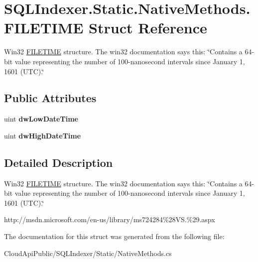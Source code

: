 \hypertarget{struct_s_q_l_indexer_1_1_static_1_1_native_methods_1_1_f_i_l_e_t_i_m_e}{\section{S\-Q\-L\-Indexer.\-Static.\-Native\-Methods.\-F\-I\-L\-E\-T\-I\-M\-E Struct Reference}
\label{struct_s_q_l_indexer_1_1_static_1_1_native_methods_1_1_f_i_l_e_t_i_m_e}
}


Win32 \hyperlink{struct_s_q_l_indexer_1_1_static_1_1_native_methods_1_1_f_i_l_e_t_i_m_e}{F\-I\-L\-E\-T\-I\-M\-E} structure. The win32 documentation says this\-: \char`\"{}\-Contains a 64-\/bit value representing the number of 100-\/nanosecond intervals since January 1, 1601 (\-U\-T\-C).\char`\"{}  


\subsection*{Public Attributes}
\begin{DoxyCompactItemize}
\item 
\hypertarget{struct_s_q_l_indexer_1_1_static_1_1_native_methods_1_1_f_i_l_e_t_i_m_e_a2d953cdb872615ba14bedc9e8d54c4cd}{uint {\bfseries dw\-Low\-Date\-Time}}\label{struct_s_q_l_indexer_1_1_static_1_1_native_methods_1_1_f_i_l_e_t_i_m_e_a2d953cdb872615ba14bedc9e8d54c4cd}

\item 
\hypertarget{struct_s_q_l_indexer_1_1_static_1_1_native_methods_1_1_f_i_l_e_t_i_m_e_a946ae9df944e7d3e7a5fc0d9b99ce291}{uint {\bfseries dw\-High\-Date\-Time}}\label{struct_s_q_l_indexer_1_1_static_1_1_native_methods_1_1_f_i_l_e_t_i_m_e_a946ae9df944e7d3e7a5fc0d9b99ce291}

\end{DoxyCompactItemize}


\subsection{Detailed Description}
Win32 \hyperlink{struct_s_q_l_indexer_1_1_static_1_1_native_methods_1_1_f_i_l_e_t_i_m_e}{F\-I\-L\-E\-T\-I\-M\-E} structure. The win32 documentation says this\-: \char`\"{}\-Contains a 64-\/bit value representing the number of 100-\/nanosecond intervals since January 1, 1601 (\-U\-T\-C).\char`\"{} 

http\-://msdn.\-microsoft.\-com/en-\/us/library/ms724284\%28\-V\-S.\%29.\-aspx 

The documentation for this struct was generated from the following file\-:\begin{DoxyCompactItemize}
\item 
Cloud\-Api\-Public/\-S\-Q\-L\-Indexer/\-Static/Native\-Methods.\-cs\end{DoxyCompactItemize}
